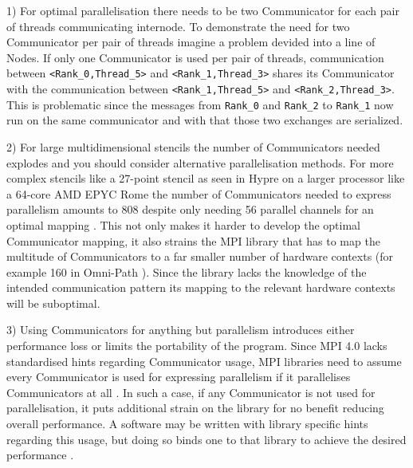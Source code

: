 \documentclass[sigconf]{acmart}
\begin{document}
1) For optimal parallelisation there needs to be two Communicator for each pair of threads communicating internode.
To demonstrate the need for two Communicator per pair of threads imagine a problem devided into a line of Nodes.
If only one Communicator is used per pair of threads, communication between \verb|<Rank_0,Thread_5>| and \verb|<Rank_1,Thread_3>| shares its Communicator with the communication between \verb|<Rank_1,Thread_5>| and \verb|<Rank_2,Thread_3>|.
This is problematic since the messages from \verb|Rank_0| and \verb|Rank_2| to \verb|Rank_1| now run on the same communicator and with that those two exchanges are serialized.

2) For large multidimensional stencils the number of Communicators needed explodes and you should consider alternative parallelisation methods.
For more complex stencils like a 27-point stencil as seen in Hypre\cite{hypre2020} on a larger processor like a 64-core AMD EPYC Rome the number of Communicators needed to express parallelism amounts to 808 despite only needing 56 parallel channels for an optimal mapping \cite{zambreLessonsLearned2022}.
This not only makes it harder to develop the optimal Communicator mapping, it also strains the MPI library that has to map the multitude of Communicators to a far smaller number of hardware contexts (for example 160 in Omni-Path \cite{intelOmniPath}).
Since the library lacks the knowledge of the intended communication pattern its mapping to the relevant hardware contexts will be suboptimal.

3) Using Communicators for anything but parallelism introduces either performance loss or limits the portability of the program.
Since MPI 4.0 lacks standardised hints regarding Communicator usage, MPI libraries need to assume every Communicator is used for expressing parallelism if it parallelises Communicators at all .
In such a case, if any Communicator is not used for parallelisation, it puts additional strain on the library for no benefit reducing overall performance.
A software may be written with library specific hints regarding this usage, but doing so binds one to that library to achieve the desired performance \cite{zambreLessonsLearned2022}.
\end{document}
